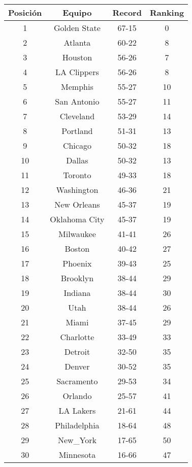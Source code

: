 \begin{tabular}{|c|c|c|c|}
\hline
Posici\'on & Equipo & Record & Ranking\\
\hline
1 & Golden State & 67-15 & 0 \\
\hline
2 & Atlanta & 60-22 & 8 \\
\hline
3 & Houston & 56-26 & 7 \\
\hline
4 & LA Clippers & 56-26 & 8 \\
\hline
5 & Memphis & 55-27 & 10 \\
\hline
6 & San Antonio & 55-27 & 11 \\
\hline
7 & Cleveland & 53-29 & 14 \\
\hline
8 & Portland & 51-31 & 13 \\
\hline
9 & Chicago & 50-32 & 18 \\
\hline
10 & Dallas & 50-32 & 13 \\
\hline
11 & Toronto & 49-33 & 18 \\
\hline
12 & Washington & 46-36 & 21 \\
\hline
13 & New Orleans & 45-37 & 19 \\
\hline
14 & Oklahoma City & 45-37 & 19 \\
\hline
15 & Milwaukee & 41-41 & 26 \\
\hline
16 & Boston & 40-42 & 27 \\
\hline
17 & Phoenix & 39-43 & 25 \\
\hline
18 & Brooklyn & 38-44 & 29 \\
\hline
19 & Indiana & 38-44 & 30 \\
\hline
20 & Utah & 38-44 & 26 \\
\hline
21 & Miami & 37-45 & 29 \\
\hline
22 & Charlotte & 33-49 & 33 \\
\hline
23 & Detroit & 32-50 & 35 \\
\hline
24 & Denver & 30-52 & 35 \\
\hline
25 & Sacramento & 29-53 & 34 \\
\hline
26 & Orlando & 25-57 & 41 \\
\hline
27 & LA Lakers & 21-61 & 44 \\
\hline
28 & Philadelphia & 18-64 & 48 \\
\hline
29 & New_York & 17-65 & 50 \\
\hline
30 & Minnesota & 16-66 & 47 \\
\hline
\end{tabular} \\

